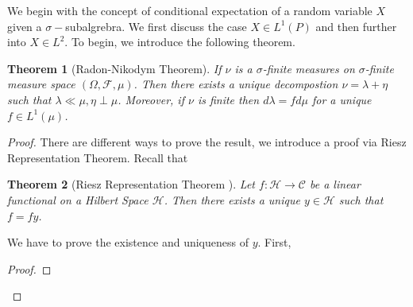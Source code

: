 \documentclass[11pt,english]{smfart}
\newtheorem{theorem}{Theorem}[subsection]
\newcommand{\mc}{\mathcal}
\begin{document}
We begin with the concept of conditional expectation of a random variable $X$ given a $\sigma-$subalgrebra. We first discuss the case $X \in L^1(P)$ and then further into $X \in L^2$. To begin, we introduce the following theorem.\\

\begin{theorem}[Radon-Nikodym Theorem]
    If $\nu $ is a $\sigma$-finite measures on $\sigma$-finite measure space $(\Omega,\mathcal{F},\mu )$. Then there exists a unique decompostion $\nu = \lambda + \eta$ such that $\lambda \ll \mu, \eta \perp \mu$. Moreover, if $\nu$ is finite then $d\lambda = fd\mu$ for a unique $f\in L^1(\mu)$.
\end{theorem}

\begin{proof}
    There are different ways to prove the result, we introduce a proof via Riesz Representation Theorem. Recall that \\
    \begin{theorem}[Riesz Representation Theorem ]
        Let $f :\mc{H} \rightarrow  \mc{C}$ be a linear functional on a Hilbert Space $\mc{H}$. Then there exists a unique $y \in \mc{H}$ such that $f = fy$.
    \end{theorem}
    We have to prove the existence and uniqueness of $y$. First,
    \begin{proof}
        
    \end{proof}
    

\end{proof}
\end{document}
